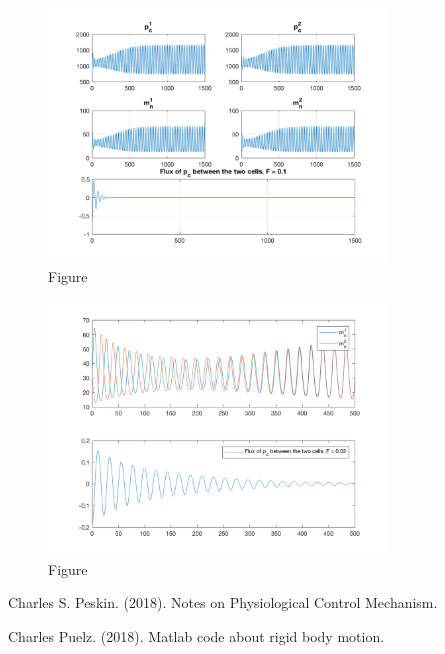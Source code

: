 \documentclass[12pt]{article}
\renewcommand{\(}{\left (}
\renewcommand{\)}{\right )}
\begin{document}
\begin{figure}[ht]
    \centering
	\begin{minipage}{0.99\textwidth}
		\centering
		\includegraphics[width=0.8\textwidth]{two_cell_same_period_diff_states_F10.png}
		\caption*{\small Figure}
	\end{minipage}
\end{figure}

\begin{figure}[ht]
    \centering
	\begin{minipage}{0.99\textwidth}
		\centering
		\includegraphics[width=0.8\textwidth]{two_mn_compare_F02.png}
		\caption*{\small Figure}
	\end{minipage}
\end{figure}

\begin{thebibliography}{9}

	Charles S. Peskin. (2018).
	Notes on Physiological Control Mechanism.

	Charles Puelz. (2018).
	Matlab code about rigid body motion.




\end{thebibliography}
\end{document}
